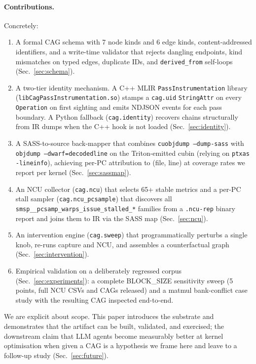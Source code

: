 \documentclass[10pt]{article}
\begin{document}
\paragraph{Contributions.} Concretely:
\begin{enumerate}[leftmargin=*,itemsep=0.15em,topsep=0.2em]
  \item A formal CAG schema with 7 node kinds and 6 edge kinds, content-addressed identifiers, and a write-time validator that rejects dangling endpoints, kind mismatches on typed edges, duplicate IDs, and \texttt{derived\_from} self-loops (Sec.~\ref{sec:schema}).
  \item A two-tier identity mechanism. A C++ MLIR \texttt{PassInstrumentation} library (\texttt{libCagPassInstrumentation.so}) stamps a \texttt{cag.uid} \texttt{StringAttr} on every \texttt{Operation} on first sighting and emits NDJSON events for each pass boundary. A Python fallback (\texttt{cag.identity}) recovers chains structurally from IR dumps when the C++ hook is not loaded (Sec.~\ref{sec:identity}).
  \item A SASS-to-source back-mapper that combines \texttt{cuobjdump --dump-sass} with \texttt{objdump --dwarf=decodedline} on the Triton-emitted cubin (relying on \texttt{ptxas -lineinfo}), achieving per-PC attribution to (file, line) at coverage rates we report per kernel (Sec.~\ref{sec:sassmap}).
  \item An NCU collector (\texttt{cag.ncu}) that selects 65+ stable metrics and a per-PC stall sampler (\texttt{cag.ncu\_pcsample}) that discovers all \texttt{smsp\_\_pcsamp\_warps\_issue\_stalled\_*} families from a \texttt{.ncu-rep} binary report and joins them to IR via the SASS map (Sec.~\ref{sec:ncu}).
  \item An intervention engine (\texttt{cag.sweep}) that programmatically perturbs a single knob, re-runs capture and NCU, and assembles a counterfactual graph (Sec.~\ref{sec:intervention}).
  \item Empirical validation on a deliberately regressed corpus (Sec.~\ref{sec:experiments}): a complete BLOCK\_SIZE sensitivity sweep (5 points, full NCU CSVs and CAGs released) and a matmul bank-conflict case study with the resulting CAG inspected end-to-end.
\end{enumerate}

We are explicit about scope. This paper introduces the substrate and demonstrates that the artifact can be built, validated, and exercised; the downstream claim that LLM agents become measurably better at kernel optimisation when given a CAG is a hypothesis we frame here and leave to a follow-up study (Sec.~\ref{sec:future}).
\end{document}
